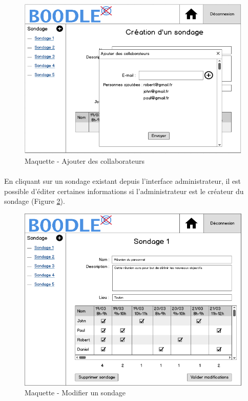 \documentclass[titlepage]{report}
\begin{document}
\begin{figure}[h]
	\caption{Maquette - Ajouter des collaborateurs}
	\label{maquette_popupAddParticipants}
	\centering
	\includegraphics[scale=0.7]{figures/maquettes/popupAddParticipants.png}
\end{figure}

\paragraph{}En cliquant sur un sondage existant depuis l'interface administrateur, il est possible d'éditer certaines informations si l'administrateur est le créateur du sondage (Figure \ref{maquette_modifierEvenement}).

\begin{figure}[h]
	\caption{Maquette - Modifier un sondage}
	\label{maquette_modifierEvenement}
	\centering
	\includegraphics[scale=0.7]{figures/maquettes/modifierEvenement.png}
\end{figure}
\end{document}
